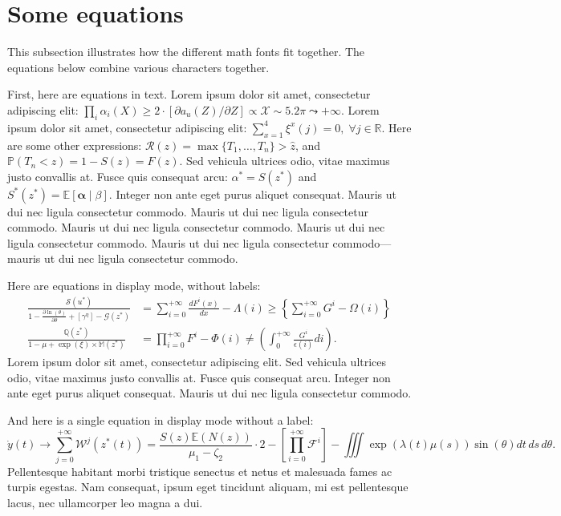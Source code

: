 \section{Some equations} 

This subsection illustrates how the different math fonts fit together. The equations below combine various characters together.

First, here are equations in text. Lorem ipsum dolor sit amet, consectetur adipiscing elit: $\prod_i\alpha_i(X) \geq 2 \cdot [\partial a_u(Z)/\partial Z] \propto \mathcal{X} \sim 5.2\pi \leadsto +\infty$. Lorem ipsum dolor sit amet, consectetur adipiscing elit: $\sum_{x=1}^4 \xi^x(j)=0, \; \forall j\in \mathbb{R}$. Here are some other expressions: $\mathcal{R}(z) = \max\{T_1,\ldots,T_{n}\} > \hat{z}$, and  $\mathbb{P}(T_n < z) = 1 - S(z) = F(z)$.  Sed vehicula ultrices odio, vitae maximus justo convallis at. Fusce quis consequat arcu: $\alpha^* = S(z^*)$ and $S^*(z^*)=\mathbb{E}[\bm{\alpha}\mid \beta]$. Integer non ante eget purus aliquet consequat. Mauris ut dui nec ligula consectetur commodo. Mauris ut dui nec ligula consectetur commodo. Mauris ut dui nec ligula consectetur commodo. Mauris ut dui nec ligula consectetur commodo. Mauris ut dui nec ligula consectetur commodo---mauris ut dui nec ligula consectetur commodo.

Here are equations in display mode, without labels:
\begin{align*}
\frac{\mathcal{S}(u^*)}{1 - \frac{\partial \ln(\theta)}{\partial \theta} + \left[\gamma^\eta\right] - \mathcal{G}(z^*)} &= \sum_{i=0}^{+\infty}\frac{d F^{i}(x)}{d x} - \Lambda(i) \geq \left\lbrace\sum_{i=0}^{+\infty}G^{i} - \Omega(i)\right\rbrace\\
\frac{\mathbb{Q}(z^*)}{1 -\mu + \exp(\xi) \times \mathbb{M}(z^*)} &= \prod_{i=0}^{+\infty}F^{i} - \Phi(i) \neq \left(\int_{0}^{+\infty}\frac{G^{i}}{\epsilon(i)} di\right).
\end{align*}
Lorem ipsum dolor sit amet, consectetur adipiscing elit. Sed vehicula ultrices odio, vitae maximus justo convallis at. Fusce quis consequat arcu. Integer non ante eget purus aliquet consequat. Mauris ut dui nec ligula consectetur commodo.

And here is a single equation in display mode without a label:
\begin{equation*}
\dot{y}(t) \to \sum_{j=0}^{+\infty}\mathcal{W}^j(z^{\ast}(t)) = \frac{S(z) \mathbb{E}(N(z))}{\mu_1 - \zeta_2} \cdot 2 - \left[\prod_{i=0}^{+\infty}\mathcal{F}^{i}\right]-\iiint\exp(\lambda(t) \mu(s)) \sin(\theta)dt\,ds\,d\theta.
\end{equation*}
Pellentesque habitant morbi tristique senectus et netus et malesuada fames ac turpis egestas. Nam consequat, ipsum eget tincidunt aliquam, mi est pellentesque lacus, nec ullamcorper leo magna a dui.

